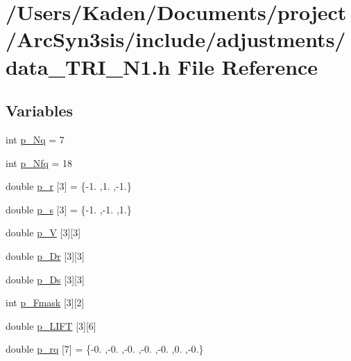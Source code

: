 \hypertarget{a00987}{}\section{/\+Users/\+Kaden/\+Documents/project/\+Arc\+Syn3sis/include/adjustments/data\+\_\+\+T\+R\+I\+\_\+\+N1.h File Reference}
\label{a00987}
\subsection*{Variables}
\begin{DoxyCompactItemize}
\item 
int \hyperlink{a00987_a207fd9268dfef5bf1505928a4f4c774a}{p\+\_\+\+Nq} = 7
\item 
int \hyperlink{a00987_aa030b0a9fe619a48647119bacea600e0}{p\+\_\+\+Nfq} = 18
\item 
double \hyperlink{a00987_a7e52da56416e11a4783c0aa859d6b478}{p\+\_\+r} \mbox{[}3\mbox{]} = \{-\/1. ,1. ,-\/1.\}
\item 
double \hyperlink{a00987_a4c959c774f208d54bee20ec721ff52fe}{p\+\_\+s} \mbox{[}3\mbox{]} = \{-\/1. ,-\/1. ,1.\}
\item 
double \hyperlink{a00987_a9a1b0b6d1a009b238af1cd0be11d7dd9}{p\+\_\+V} \mbox{[}3\mbox{]}\mbox{[}3\mbox{]}
\item 
double \hyperlink{a00987_a718230132f9add142e28fd9078b7a818}{p\+\_\+\+Dr} \mbox{[}3\mbox{]}\mbox{[}3\mbox{]}
\item 
double \hyperlink{a00987_afe9c30056feb5271f416346c6ea6c40e}{p\+\_\+\+Ds} \mbox{[}3\mbox{]}\mbox{[}3\mbox{]}
\item 
int \hyperlink{a00987_a19c5c57b7dc71eb0fbdc015125cce46a}{p\+\_\+\+Fmask} \mbox{[}3\mbox{]}\mbox{[}2\mbox{]}
\item 
double \hyperlink{a00987_a162ef160c01b03cd05791dc9a6acc934}{p\+\_\+\+L\+I\+FT} \mbox{[}3\mbox{]}\mbox{[}6\mbox{]}
\item 
double \hyperlink{a00987_a05c68fe6b5d65c6365beb9277fb637f0}{p\+\_\+rq} \mbox{[}7\mbox{]} = \{-\/0. ,-\/0. ,-\/0. ,-\/0. ,-\/0. ,0. ,-\/0.\}

\end{DoxyCompactItemize}
